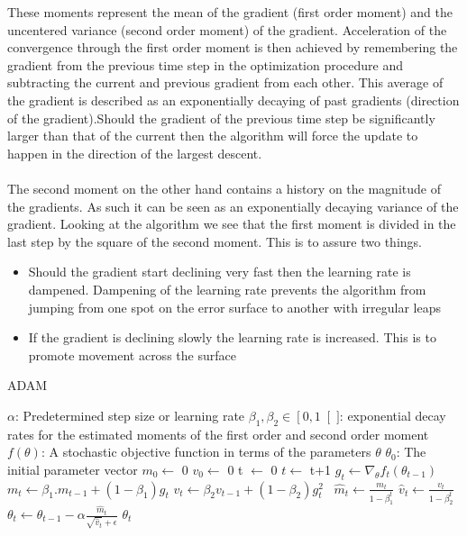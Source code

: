 \documentclass[12pt]{article}
\begin{document}
These moments represent the mean of the gradient (first order moment) and the uncentered variance (second order moment) of the gradient\cite{Kingma2014}. Acceleration of the convergence through the first order moment is then achieved by remembering the gradient from the previous time step in the optimization procedure and subtracting the current and previous gradient from each other. This average of the gradient is described as an exponentially decaying of past gradients (direction of the gradient).Should the gradient of the previous time step be significantly larger than that of the current then the algorithm will force the update to happen in the direction of the largest descent. \cite{Budumu}
\\
\\
The second moment on the other hand contains a history on the magnitude of the gradients. As such it can be seen as an exponentially decaying variance of the gradient. Looking at the algorithm we see that the first moment is divided in the last step by the square of the second moment. This is to assure two things.
\begin{itemize}
	\item Should the gradient start declining very fast then the learning rate is dampened. Dampening of the learning rate prevents the algorithm from jumping from one spot on the error surface to another with irregular leaps
	\item If the gradient is declining slowly the learning rate is increased. This is to promote movement across the surface
\end{itemize}
\begin{algorithm}[H]
	\caption{ADAM}
	\begin{algorithmic}[1]
		\Require $\alpha$: Predetermined step size or learning rate
		\Require $\beta_1, \beta_2 \in \left[0,1\right[]$: exponential decay rates for the estimated moments of the first order and second order moment
		\Require $f(\theta)$: A stochastic objective function in terms of the parameters $\theta$ 
		\Require $\theta_0$: The initial parameter vector
		\State $m_0 \leftarrow$ 0  
		\State $v_0 \leftarrow$ 0 
		\State t $\leftarrow$ 0 
		\State $t \leftarrow$ t+1
		\State $g_t \leftarrow \nabla_{\theta}f_t(\theta_{t-1})$ 
		\State $m_t \leftarrow \beta_1.m_{t-1}+(1-\beta_1)g_t$ 
		\State $v_t \leftarrow \beta_2 v_{t-1}+ (1-\beta_2)g_t^2$ \
		\State $\hat{m}_t \leftarrow \frac{m_t}{1-\beta_1^t}$ 
		\State $\hat{v}_t \leftarrow \frac{v_t}{1-\beta_2^t}$ 
		\State $\theta_t \leftarrow \theta_{t-1}-\alpha \frac{\hat{m}_t}{\sqrt{\hat{v}_t}+\epsilon} $ 
		\EndWhile
		\State \Return $\theta_t$
	\end{algorithmic}
\end{algorithm}
\cite{Kingma2014}  
\newpage
\cleardoublepage
\end{document}
